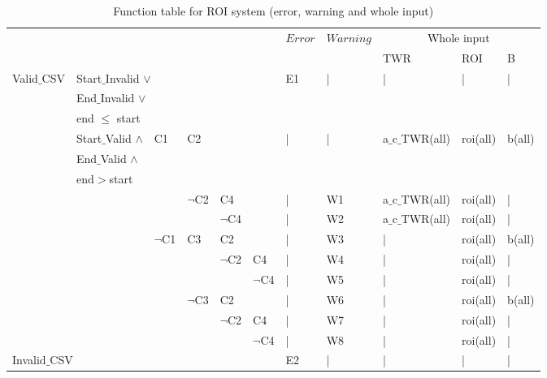 \documentclass[runningheads,12pt]{article}
\begin{document}
\newpage
\begin{landscape}
\begin{table}

\centering

\begin{tabular}{|l|l|l|l|l|l||l|l|l|l|l|}
\hline
\multicolumn{6}{|c||}{} & $Error$ & $Warning$ & \multicolumn{3}{|c|}{Whole input}\\ 


\multicolumn{6}{|c||}{} & & & TWR & ROI & B\\ 


\hline
Valid$\_$CSV & \multicolumn{5}{|l||}{Start$\_$Invalid $\vee$ } & E1 & | & | & | & |\\ 
& \multicolumn{5}{|l||}{End$\_$Invalid $\vee$}& & & &&\\
& \multicolumn{5}{|l||}{end $\le$ start}& & & &&\\

\cline{2-11}
& Start$\_$Valid  $\wedge$ & C1 & \multicolumn{3}{|l||}{C2} & | & | & a$\_$c$\_$TWR(all) & roi(all) & b(all)\\
& End$\_$Valid $\wedge$& &\multicolumn{3}{|l||}{}&&&&&\\
& end$>$start &&\multicolumn{3}{|l||}{}&&&&&\\

\cline{4-11}
& & & $\lnot$C2 &\multicolumn{2}{|l||}{C4} & | & W1 & a$\_$c$\_$TWR(all) & roi(all) & |\\

\cline{5-11}
& & & &\multicolumn{2}{|l||}{$\lnot$C4} & | & W2 & a$\_$c$\_$TWR(all) & roi(all) & |\\

\cline{3-11}
& & $\lnot$C1 & C3 &\multicolumn{2}{|l||}{C2} & | & W3 & | & roi(all) & b(all)\\

\cline{5-11}
& & & & $\lnot$C2 & C4 & | & W4 & | & roi(all) & |\\

\cline{6-11}
& & & & & $\lnot$C4 & | & W5 & | & roi(all) & |\\

\cline{4-11}
& & & $\lnot$C3 &\multicolumn{2}{|l||}{C2} & | & W6 & | & roi(all) & b(all)\\

\cline{5-11}
& & & & $\lnot$C2 & C4 & | & W7 & | & roi(all) & |\\

\cline{6-11}
& & & & & $\lnot$C4 & | & W8 & | & roi(all) & |\\

\hline
\multicolumn{6}{|l||}{Invalid$\_$CSV} & E2 & | & | & | & |\\ 


\hline
\end{tabular}
\caption{Function table for ROI system (error, warning and whole input)}
\label{table:table_ROI}
\end{table}
\end{landscape}
\end{document}
